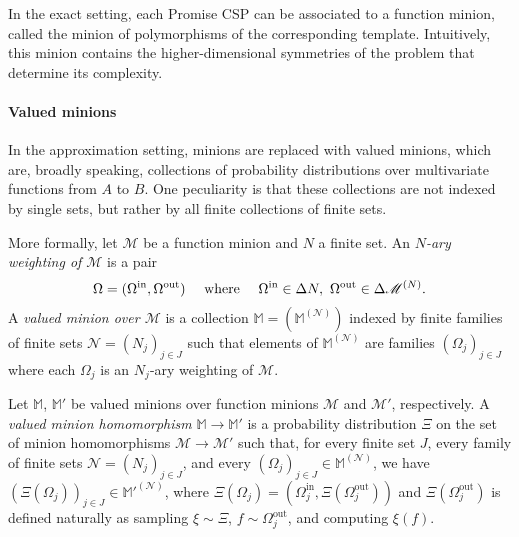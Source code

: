 \documentclass[a4paper,11pt]{article}
\theoremstyle{definition}
\newcommand{\mnn}[1]{\mathscr{#1}}
\newcommand{\vmnn}[1]{\mathbb{#1}}
\newcommand{\OmegaI}{\Omega^{\mathrm{in}}}
\newcommand{\OmegaO}{\Omega^{\mathrm{out}}}
\begin{document}
In the exact setting, each Promise CSP can be associated to a function minion, called the minion of polymorphisms of the corresponding template. Intuitively, this minion contains the higher-dimensional symmetries of the problem that determine its complexity. 




\paragraph{Valued minions}

In the approximation setting, minions are replaced with valued minions, which are, broadly speaking, collections of probability distributions over multivariate functions from $A$ to $B$. One peculiarity is that these collections are not indexed by single sets, but rather by all finite collections of finite sets.

More formally, let $\mnn M$ be a function minion and $N$ a finite set. An \emph{$N$-ary weighting of $\mnn M$} is a pair 
\[
\Omega=(\OmegaI,\OmegaO) \quad \textnormal{ where } \quad \OmegaI \in \Delta N, \ \OmegaO \in \Delta \mnn{M}^{(N)}.
\]
A \emph{valued minion over $\mnn M$} is a collection $\vmnn M = (\vmnn M^{(\mathcal{N})})$ indexed by finite families of finite sets $\mathcal{N} = (N_j)_{j \in J}$ such that elements of $\vmnn M^{(\mathcal{N})}$ are families $(\Omega_j)_{j \in J}$ where each $\Omega_j$ is an $N_j$-ary weighting of $\mnn M$. 


Let $\vmnn M$, $\vmnn M'$ be valued minions over function minions $\mnn M$ and $\mnn M'$, respectively. A \emph{valued minion homomorphism} $\vmnn M \to \vmnn M'$ is a probability distribution $\Xi$ on the set of minion homomorphisms $\mnn M \to \mnn M'$ such that, for every finite set $J$, every family of finite sets $\mathcal{N} = (N_j)_{j \in J}$, and every $(\Omega_j)_{j \in J} \in \vmnn M^{(\mathcal{N})}$, we have  $(\Xi(\Omega_j))_{j \in J} \in \vmnn M'^{(\mathcal{N})}$, where $\Xi(\Omega_j) = (\OmegaI_j, \Xi(\OmegaO_j))$ and $\Xi(\OmegaO_j)$ is defined naturally as sampling $\xi\sim\Xi$, $f\sim \OmegaO_j$, and computing $\xi(f)$. 
\end{document}

